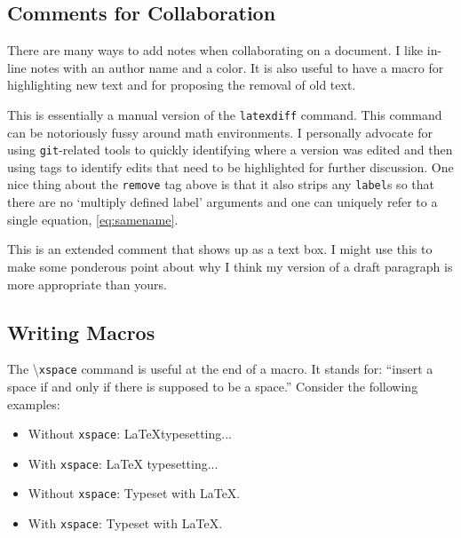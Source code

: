 \subsection{Comments for Collaboration}

There are many ways to add notes when collaborating on a document. I like in-line notes with an author name and a color.   It is also useful to have a macro for highlighting new text and for proposing the removal of old text.



This is essentially a manual version of the \texttt{latexdiff} command. This command can be notoriously fussy around math environments. I personally advocate for using \texttt{git}-related tools to quickly identifying where a version was edited and then using tags to identify edits that need to be highlighted for further discussion. One nice thing about the \texttt{remove} tag above is that it also strips any \texttt{label}s so that there are no `multiply defined label' arguments and one can uniquely refer to a single equation, \eqref{eq:samename}.

\begin{flipcomment}
This is an extended comment that shows up as a text box. I might use this to make some ponderous point about why I think my version of a draft paragraph is more appropriate than yours.
\end{flipcomment}


\subsection{Writing Macros}

The \textbackslash\texttt{xspace} command is useful at the end of a macro. It stands for: ``insert a space if and only if there is supposed to be a space.'' Consider the following examples:
\begin{itemize}
	\item Without \texttt{xspace}: \LaTeX typesetting...
	\item With \texttt{xspace}: \LaTeX\xspace typesetting...
	\item Without \texttt{xspace}: Typeset with \LaTeX.
	\item With \texttt{xspace}: Typeset with \LaTeX\xspace.
\end{itemize}



